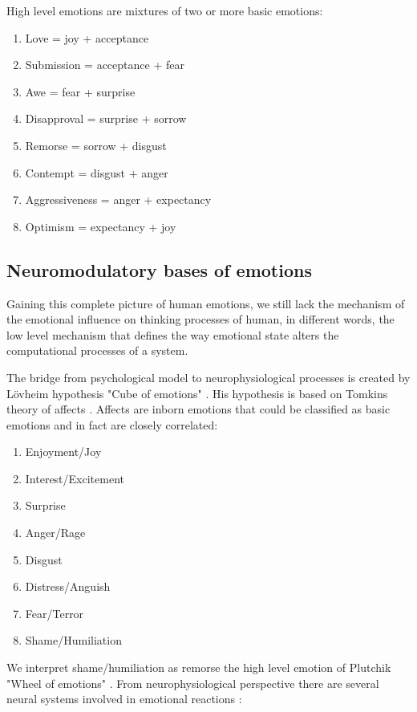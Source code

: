 High level emotions are mixtures of two or more basic emotions:

\begin{enumerate}
 \item  Love = joy + acceptance
 \item  Submission = acceptance + fear
 \item  Awe = fear + surprise
 \item  Disapproval = surprise + sorrow
 \item  Remorse = sorrow + disgust
 \item  Contempt = disgust + anger
 \item  Aggressiveness = anger + expectancy
 \item  Optimism = expectancy + joy
\end{enumerate}

\subsection{Neuromodulatory bases of emotions}

Gaining this complete picture of human emotions, we still lack the mechanism of the emotional influence on thinking processes of human, in different words, the low level mechanism that defines the way emotional state alters the computational processes of a system.

The bridge from psychological model to neurophysiological processes is created by L\"{o}vheim hypothesis "Cube of emotions" \cite{cubeofemotions}. His hypothesis is based on Tomkins theory of affects \cite{tomkins1, tomkins2, tomkins3, quest, primer_affect_psychology}. Affects are inborn emotions that could be classified as basic emotions and in fact are closely correlated:

\begin{enumerate}
 \item  Enjoyment/Joy
 \item  Interest/Excitement
 \item  Surprise
 \item  Anger/Rage
 \item  Disgust
 \item  Distress/Anguish
 \item  Fear/Terror
 \item  Shame/Humiliation
\end{enumerate}

We interpret shame/humiliation as remorse the high level emotion of  Plutchik "Wheel of emotions" \cite{natureofemotions}. From neurophysiological perspective there are several neural systems involved in emotional reactions \cite{emotionsbraintorobot, neuromodulatory}:

